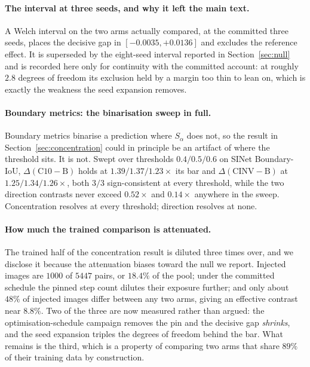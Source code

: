 \documentclass{article} %
\begin{document}


\paragraph{The interval at three seeds, and why it left the main text.} A Welch interval on the two
arms actually compared, at the committed three seeds, places the decisive gap in
$[-0.0035, +0.0136]$ and excludes the reference effect. It is superseded by the eight-seed interval
reported in Section~\ref{sec:null} and is recorded here only for continuity with the committed
account: at roughly $2.8$ degrees of freedom its exclusion held by a margin too thin to lean on,
which is exactly the weakness the seed expansion removes.

\paragraph{Boundary metrics: the binarisation sweep in full.} Boundary metrics binarise a
prediction where $S_\alpha$ does not, so the result in Section~\ref{sec:concentration} could in
principle be an artifact of where the threshold sits. It is not. Swept over thresholds
$0.4 / 0.5 / 0.6$ on SINet Boundary-IoU, $\Delta(\mathrm{C10}-\mathrm{B})$ holds at
$1.39 / 1.37 / 1.23 \times$ its bar and $\Delta(\mathrm{CINV}-\mathrm{B})$ at
$1.25 / 1.34 / 1.26 \times$, both $3/3$ sign-consistent at every threshold, while the two direction
contrasts never exceed $0.52\times$ and $0.14\times$ anywhere in the sweep. Concentration resolves
at every threshold; direction resolves at none.

\paragraph{How much the trained comparison is attenuated.} The trained half of the concentration
result is diluted three times over, and we disclose it because the attenuation biases toward the
null we report. Injected images are $1000$ of $5447$ pairs, or $18.4\%$ of the pool; under the
committed schedule the pinned step count dilutes their exposure further; and only about $48\%$ of
injected images differ between any two arms, giving an effective contrast near $8.8\%$. Two of the
three are now measured rather than argued: the optimisation-schedule campaign removes the pin and
the decisive gap \emph{shrinks}, and the seed expansion triples the degrees of freedom behind the
bar. What remains is the third, which is a property of comparing two arms that share $89\%$ of
their training data by construction.
\end{document}
